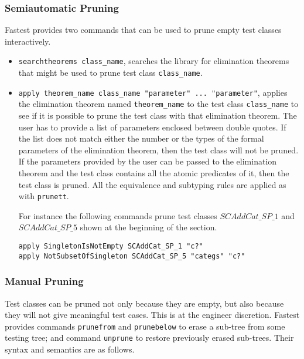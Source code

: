 \subsubsection{Semiautomatic Pruning}
Fastest provides two commands that can be used to prune empty test classes interactively.

\begin{itemize}
\item \verb+searchtheorems class_name+, searches the library for elimination theorems that might be used to prune test class \verb+class_name+.

\item \verb+apply theorem_name class_name "parameter" ... "parameter"+, applies the elimination theorem named \linebreak \verb+theorem_name+ to the test class \verb+class_name+ to see if it is possible to prune the test class with that elimination theorem. The user has to provide a list of parameters enclosed between double quotes. If the list does not match either the number or the types of the formal parameters of the elimination theorem, then the test class will not be pruned. If the parameters provided by the user can be passed to the elimination theorem and the test class contains all the atomic predicates of it, then the test class is pruned. All the equivalence and subtyping rules are applied as with \verb+prunett+. 

For instance the following commands prune test classes $SCAddCat\_SP\_1$ and $SCAddCat\_SP\_5$ shown at the beginning of the section.

\begin{verbatim}
apply SingletonIsNotEmpty SCAddCat_SP_1 "c?"
apply NotSubsetOfSingleton SCAddCat_SP_5 "categs" "c?"
\end{verbatim}

\end{itemize}

\subsubsection{\label{prunefrom}Manual Pruning}

Test classes can be pruned not only because they are empty, but also because they will not give meaningful test cases. This is at the engineer discretion.   Fastest provides commands \verb+prunefrom+ and \verb+prunebelow+ to erase a sub-tree from some testing tree; and command \verb+unprune+ to restore previously erased sub-trees. Their syntax and semantics are as follows.

